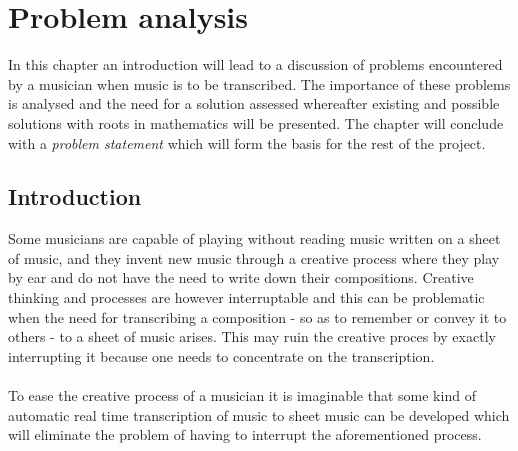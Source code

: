 \chapter{Problem analysis} \label{ch1}
In this chapter an introduction will lead to a discussion of problems encountered by a musician when music is to be transcribed. The importance of these problems is analysed and the need for a solution assessed whereafter existing and possible solutions with roots in mathematics will be presented. The chapter will conclude with a \textit{problem statement} which will form the basis for the rest of the project.
\section{Introduction}
Some musicians are capable of playing without reading music written on a sheet of music, and they invent new music through a creative process where they play by ear and do not have the need to write down their compositions. Creative thinking and processes are however interruptable and this can be problematic when the need for transcribing a composition - so as to remember or convey it to others - to a sheet of music arises. This may ruin the creative proces by exactly interrupting it because one needs to concentrate on the transcription.\\\\
To ease the creative process of a musician it is imaginable that some kind of automatic real time transcription of music to sheet music can be developed which will eliminate the problem of having to interrupt the aforementioned process.
